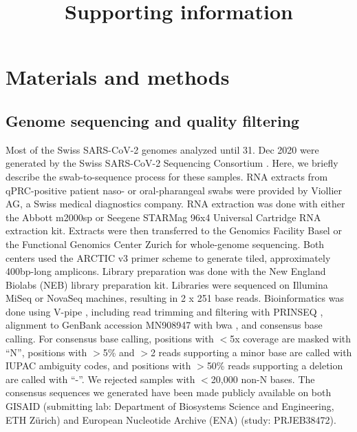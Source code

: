 \documentclass[9pt,twoside,lineno]{pnas-new}
\title{Supporting information}
\author{}
\begin{document}
\maketitle 

\tableofcontents

\newpage

\section{Materials and methods}
\subsection{Genome sequencing and quality filtering}
Most of the Swiss SARS-CoV-2 genomes analyzed until 31. Dec 2020 were generated by the Swiss SARS-CoV-2 Sequencing Consortium \cite{s3c-webpage}. Here, we briefly describe the swab-to-sequence process for these samples. RNA extracts from qPRC-positive patient naso- or oral-pharangeal swabs were provided by Viollier AG, a Swiss medical diagnostics company. RNA extraction was done with either the Abbott m2000sp or Seegene STARMag 96x4 Universal Cartridge RNA extraction kit. Extracts were then  transferred to the Genomics Facility Basel or the Functional Genomics Center Zurich for whole-genome sequencing. Both centers used the ARCTIC v3 primer scheme \cite{Quick2017, ARCTICNetwork} to generate tiled, approximately 400bp-long amplicons. Library preparation was done with the New England Biolabs (NEB) library preparation kit. Libraries were sequenced on Illumina MiSeq or NovaSeq machines, resulting in 2 x 251 base reads. Bioinformatics was done using V-pipe \cite{v-pipe-bioinformatics}, including read trimming and filtering with PRINSEQ \cite{Schmieder2011}, alignment to GenBank accession MN908947 \cite{Wu2020} with bwa \cite{Li2009}, and consensus base calling. For consensus base calling, positions with $<$5x coverage are masked with ``N'', positions with $>$5\% and $>$2 reads supporting a minor base are called with IUPAC ambiguity codes, and positions with $>$50\% reads supporting a deletion are called with ``-''. We rejected samples with $<$20,000 non-N bases. The consensus sequences we generated have been made publicly available on both GISAID (submitting lab: Department of Biosystems Science and Engineering, ETH Zürich) and European Nucleotide Archive (ENA) (study: PRJEB38472).
\end{document}
